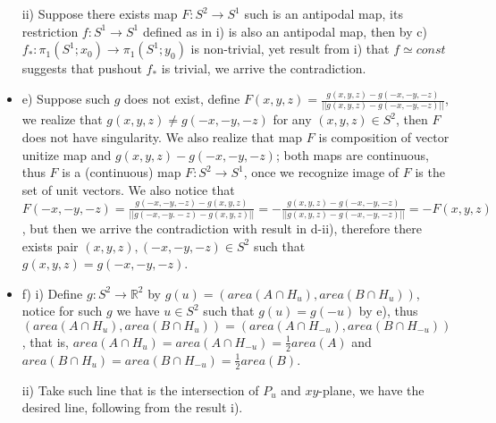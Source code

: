 \documentclass[11pt]{article}
\def\R{{\mathbb R}}
\theoremstyle{remark}
\begin{document}
\begin{itemize}
         ii) Suppose there exists map $F:S^2 \rightarrow S^1$ such is an antipodal map, its restriction $f:S^1 \rightarrow S^1$ defined as in i) is also an antipodal map, then by c) $f_*:\pi_1(S^1;x_0)\rightarrow\pi_1(S^1;y_0)$ is non-trivial, yet result from i) that $f\simeq const$ suggests that pushout $f_*$ is trivial, we arrive the contradiction.
        
    \item e) Suppose such $g$ does not exist, define $F(x,y,z)= \frac{g(x,y,z)-g(-x,-y,-z)}{||g(x,y,z)-g(-x,-y,-z)||}$, we realize that $g(x,y,z)\neq g(-x,-y,-z)$ for any $(x,y,z) \in S^2$, then $F$ does not have singularity. We also realize that map $F$ is composition of vector unitize map and $g(x,y,z)-g(-x,-y,-z)$; both maps are continuous, thus $F$ is a (continuous) map $F:S^2 \rightarrow S^1$, once we recognize image of $F$ is the set of unit vectors. We also notice that $F(-x,-y,-z)=\frac{g(-x,-y,-z)-g(x,y,z)}{||g(-x,-y.-z)-g(x,y,z)||}=-\frac{g(x,y,z)-g(-x,-y,-z)}{||g(x,y,z)-g(-x,-y,-z)||}=-F(x,y,z)$, but then we arrive the contradiction with result in d-ii), therefore there exists pair $(x,y,z),(-x,-y,-z) \in S^2$ such that $g(x,y,z)=g(-x,-y,-z)$.
    
    \item f)
         i) Define $g:S^2\rightarrow \R^2$ by $g(u)=(area(A\cap H_u),area(B\cap H_u))$, notice for such $g$ we have $u\in S^2$ such that $g(u)=g(-u)$ by e), thus $(area(A\cap H_u),area(B\cap H_u))=(area(A\cap H_{-u}),area(B\cap H_{-u}))$, that is, $area(A\cap H_u)=area(A\cap H_{-u})=\frac{1}{2}area(A)$ and $area(B\cap H_u)=area(B\cap H_{-u})=\frac{1}{2}area(B)$.
         
         ii) Take such line that is the intersection of $P_u$ and $xy$-plane, we have the desired line, following from the result i). 
         
    
\end{itemize}
\end{document}
